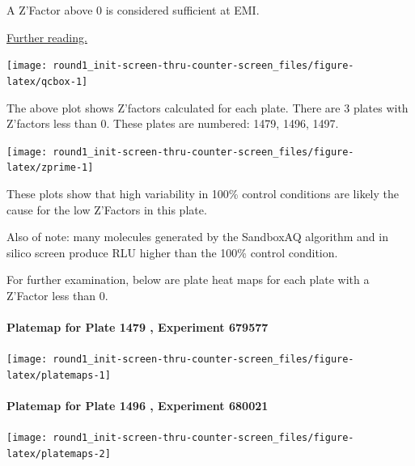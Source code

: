 \documentclass[
]{article}
\begin{document}
A Z'Factor above 0 is considered sufficient at EMI.

\href{https://pubmed.ncbi.nlm.nih.gov/10838414/}{Further reading.}

\newpage

\begin{center}\texttt{[image: round1\_init-screen-thru-counter-screen\_files/figure-latex/qcbox-1]} \end{center}

The above plot shows Z'factors calculated for each plate. There are 3
plates with Z'factors less than 0. These plates are numbered: 1479,
1496, 1497.

\begin{center}\texttt{[image: round1\_init-screen-thru-counter-screen\_files/figure-latex/zprime-1]} \end{center}

These plots show that high variability in 100\% control conditions are
likely the cause for the low Z'Factors in this plate.

Also of note: many molecules generated by the SandboxAQ algorithm and in
silico screen produce RLU higher than the 100\% control condition.

\newpage

For further examination, below are plate heat maps for each plate with a
Z'Factor less than 0.

\paragraph{Platemap for Plate 1479 , Experiment
679577}\label{platemap-for-plate-1479-experiment-679577}

\begin{center}\texttt{[image: round1\_init-screen-thru-counter-screen\_files/figure-latex/platemaps-1]} \end{center}

\newpage

\paragraph{Platemap for Plate 1496 , Experiment
680021}\label{platemap-for-plate-1496-experiment-680021}

\begin{center}\texttt{[image: round1\_init-screen-thru-counter-screen\_files/figure-latex/platemaps-2]} \end{center}

\newpage
\end{document}
